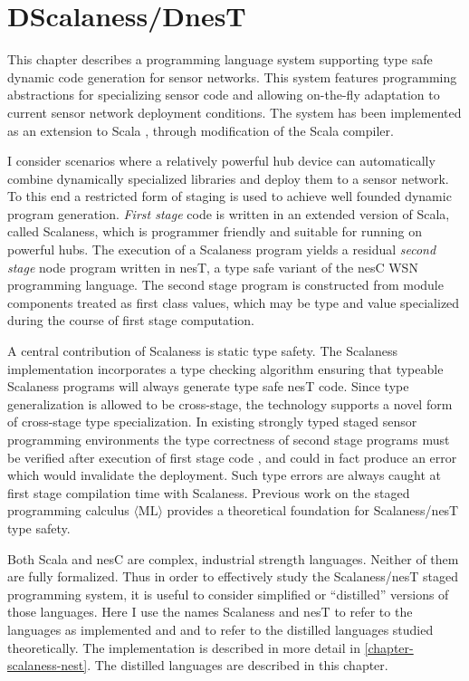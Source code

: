 
\chapter{DScalaness/DnesT}
\label{chapter-dscalaness-dnest}


This chapter describes a programming language system supporting type safe dynamic code
generation for sensor networks. This system features programming abstractions for specializing
sensor code and allowing on-the-fly adaptation to current sensor network deployment conditions.
The system has been implemented as an extension to Scala \cite{PiS2}, through modification of
the Scala compiler.

I consider scenarios where a relatively powerful hub device can automatically combine
dynamically specialized libraries and deploy them to a sensor network. To this end a restricted
form of staging \cite{Taha-MetaML,DBLP:conf/icess/Taha04,289140} is used to achieve well founded
dynamic program generation. \emph{First stage} code is written in an extended version of Scala,
called Scalaness, which is programmer friendly and suitable for running on powerful hubs. The
execution of a Scalaness program yields a residual \emph{second stage} node program written in
nesT, a type safe variant of the nesC WSN programming language. The second stage program is
constructed from module components treated as first class values, which may be type and value
specialized during the course of first stage computation.

A central contribution of Scalaness is static type safety. The Scalaness implementation
incorporates a type checking algorithm ensuring that typeable Scalaness programs will always
generate type safe nesT code. Since type generalization is allowed to be cross-stage, the
technology supports a novel form of cross-stage type specialization. In existing strongly typed
staged sensor programming environments the type correctness of second stage programs must be
verified after execution of first stage code \cite{Mainland-Flask-2008}, and could in fact
produce an error which would invalidate the deployment. Such type errors are always caught at
first stage compilation time with Scalaness. Previous work on the staged programming calculus
$\langle \text{ML} \rangle$ \cite{FramedML} provides a theoretical foundation for Scalaness/nesT
type safety.

Both Scala and nesC are complex, industrial strength languages. Neither of them are fully
formalized. Thus in order to effectively study the Scalaness/nesT staged programming system, it
is useful to consider simplified or ``distilled'' versions of those languages. Here I use the
names Scalaness and nesT to refer to the languages as implemented and  and
 to refer to the distilled languages studied theoretically. The implementation is
described in more detail in \autoref{chapter-scalaness-nest}. The distilled languages are
described in this chapter.


